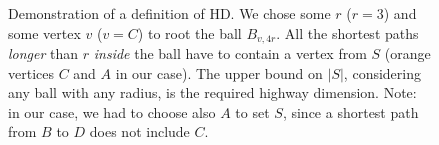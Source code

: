             \begin{figure}[h!]
                \begin{center}
                \end{center}
                \caption{\label{fig:highdemonstr} Demonstration of a definition of HD. We chose some $r$ ($r = 3$) and some vertex $v$ ($v = C$) to root the ball $B_{v, 4r}$. All the shortest paths \emph{longer} than $r$ \emph{inside} the ball have to contain a vertex from $S$ (orange vertices $C$ and $A$ in our case). The upper bound on $|S|$, considering any ball with any radius, is the required highway dimension. Note: in our case, we had to choose also $A$ to set $S$, since a shortest path from $B$ to $D$ does not include $C$.}
            \end{figure}
	